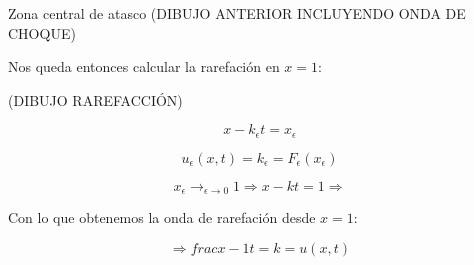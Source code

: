 \begin{example}{Zona central de atasco}
			(DIBUJO ANTERIOR INCLUYENDO ONDA DE CHOQUE)

			Nos queda entonces calcular la rarefación en $x=1$:

			(DIBUJO RAREFACCIÓN)

			$$x-k_\epsilon t = x_\epsilon$$

			$$u_\epsilon (x,t) = k_\epsilon = F_\epsilon (x_\epsilon)$$

			$$x_\epsilon \rightarrow_{\epsilon \rightarrow 0} 1 \Rightarrow x - kt = 1 \Rightarrow $$

			Con lo que obtenemos la onda de rarefación desde $x=1$:

			$$\Rightarrow 	frac{x-1}{t} = k = u(x,t)$$

		\end{example}












